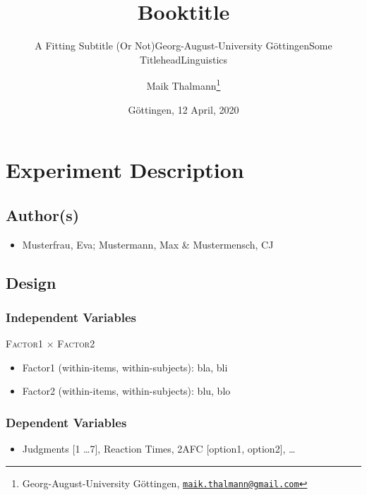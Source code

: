 \documentclass[
    numbers=noenddot,
    open=any,
    paper=a4,
    oneside,
    pagesize,
    captions=tableheading,
    bibliography=totoc,
    11pt
    ]{scrbook}
\title{Booktitle}
\subtitle{A Fitting Subtitle (Or Not)}
\subtitle{Georg-August-University Göttingen}
\subtitle{Some Titlehead}
\subtitle{Linguistics}
\author{Maik Thalmann\footnote{Georg-August-University Göttingen,
  \href{mailto:maik.thalmann@gmail.com}{\nolinkurl{maik.thalmann@gmail.com}}}}
\date{Göttingen, 12 April, 2020}
\providecommand{\tightlist}{%
    \setlength{\itemsep}{0pt}\setlength{\parskip}{0pt}}
\begin{document}
\maketitle

\tableofcontents
\hypertarget{experiment-description}{%
\part{Experiment Description}\label{experiment-description}}

\hypertarget{authors}{%
\chapter{Author(s)}\label{authors}}

\begin{itemize}
\tightlist
\item
  Musterfrau, Eva; Mustermann, Max \& Mustermensch, CJ
\end{itemize}

\hypertarget{design}{%
\chapter{Design}\label{design}}

\hypertarget{independent-variables}{%
\section{Independent Variables}\label{independent-variables}}

\textsc{Factor1} \(\times\) \textsc{Factor2}

\begin{itemize}
\tightlist
\item
  Factor1 (within-items, within-subjects): bla, bli
\item
  Factor2 (within-items, within-subjects): blu, blo
\end{itemize}

\hypertarget{dependent-variables}{%
\section{Dependent Variables}\label{dependent-variables}}

\begin{itemize}
\tightlist
\item
  Judgments {[}1 \ldots 7{]}, Reaction Times, 2AFC {[}option1,
  option2{]}, \ldots
\end{itemize}
\end{document}
